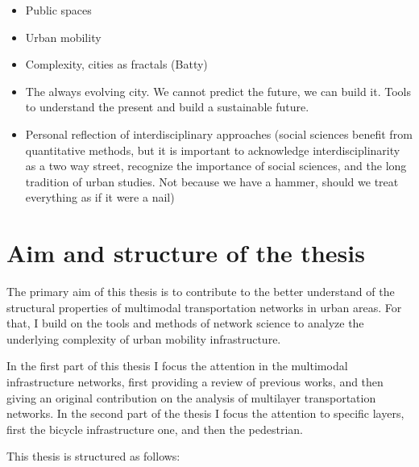 \begin{itemize}
    \item Public spaces
    \item Urban mobility
    \item Complexity, cities as fractals (Batty)
    \item The always evolving city. We cannot predict the future, we can build it. Tools to understand the present and build a sustainable future.
    \item Personal reflection of interdisciplinary approaches (social sciences benefit from quantitative methods, but it is important to acknowledge interdisciplinarity as a two way street, recognize the importance of social sciences, and the long tradition of urban studies. Not because we have a hammer, should we treat everything as if it were a nail) 
\end{itemize}


\section{Aim and structure of the thesis}


The primary aim of this thesis is to contribute to the better understand of the structural properties of multimodal transportation networks in urban areas. For that, I build on the tools and methods of network science to analyze the underlying complexity of urban mobility infrastructure. 

In the first part of this thesis I focus the attention in the multimodal infrastructure networks, first providing a review of previous works, and then giving an original contribution on the analysis of multilayer transportation networks. In the second part of the thesis I focus the attention to specific layers, first the bicycle infrastructure one, and then the pedestrian.

This thesis is structured as follows:

